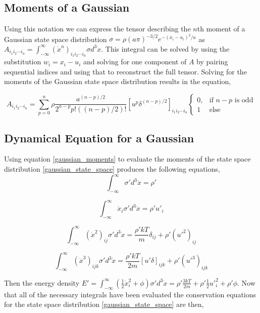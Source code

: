 \documentclass[%
 twocolumn,
 amsmath,amssymb,
 aps,
]{revtex4-1}
\newcommand{\intVdot}[1]{\int_{-\infty}^{\infty} #1 d^3\dot{x}}
\begin{document}
\subsection{Moments of a Gaussian}
Using this notation we can express the tensor describing the $n$th moment of a Gaussian state space distribution $\sigma=\rho\left(a \pi\right)^{-3/2}e^{-\left(\dot{x}_i-u_i\right)^2/a}$ as $A_{i_1i_2\cdots i_n}=\intVdot{\left(\dot{x}^n\right)_{i_1i_2\cdots i_n}\sigma}$. This integral can be solved by using the substitution $w_i=x_i - u_i$ and solving for one component of $A$ by pairing sequential indices and using that to reconstruct the full tensor. Solving for the moments of the Gaussian state space distribution results in the equation,

\begin{widetext}
\begin{equation}
A_{i_1i_2\cdots i_n}=\sum_{p=0}^n\rho\frac{a^{\left(n-p\right)/2}}{2^{n-p}p!\left(\left(n-p\right)/2\right)!}\left[u^p\delta^{\left(n-p\right)/2}\right]_{i_1i_2\cdots i_n}
\begin{cases}
0, & \text{if $n-p$ is odd}\\
1 &  \text{else}
\end{cases}
\label{gaussian_moments}
\end{equation}
\end{widetext}

\subsection{Dynamical Equation for a Gaussian}
Using equation \eqref{gaussian_moments} to evaluate the moments of the state space distribution \eqref{gaussian_state_space} produces the following equations,
\[
\intVdot{\sigma'}=\rho'
\]

\[
\intVdot{\dot{x}_i\sigma'}=\rho' u'_i
\]

\[
\intVdot{\left(\dot{x}^2\right)_{ij}\sigma'}=\frac{\rho'kT}{m}\delta_{ij} + \rho'\left(u'^2\right)_{ij}
\]

\[
\intVdot{\left(\dot{x}^3\right)_{ijk}\sigma'}=\frac{\rho'kT}{2m}\left[u'\delta\right]_{ijk} + \rho'\left(u'^3\right)_{ijk}
\]

Then the energy density $E'=\intVdot{\left(\frac{1}{2}\dot{x}_i^2 + \phi\right)\sigma'}=\rho'\frac{3kT}{2m}+\rho'\frac{1}{2}{u'}_i^2+\rho'\phi$. Now that all of the necessary integrals have been evaluated the conservation equations for the state space distribution \eqref{gaussian_state_space} are then,
\end{document}
